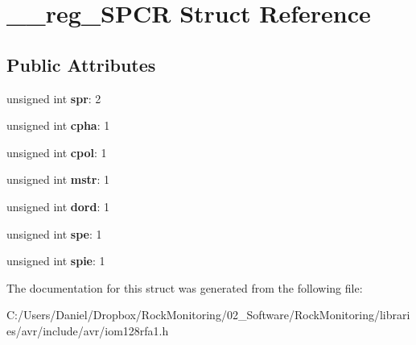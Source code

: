 \hypertarget{struct____reg___s_p_c_r}{}\section{\+\_\+\+\_\+reg\+\_\+\+S\+P\+CR Struct Reference}
\label{struct____reg___s_p_c_r}
\subsection*{Public Attributes}
\begin{DoxyCompactItemize}
\item 
unsigned int {\bfseries spr}\+: 2\hypertarget{struct____reg___s_p_c_r_aa7b7812e00307de4a4a326190c92e9a1}{}\label{struct____reg___s_p_c_r_aa7b7812e00307de4a4a326190c92e9a1}

\item 
unsigned int {\bfseries cpha}\+: 1\hypertarget{struct____reg___s_p_c_r_a503c32b8cf24f26f34dfb2f1ddf1b744}{}\label{struct____reg___s_p_c_r_a503c32b8cf24f26f34dfb2f1ddf1b744}

\item 
unsigned int {\bfseries cpol}\+: 1\hypertarget{struct____reg___s_p_c_r_ae00c7227f21e52348499e2dbf4a882f2}{}\label{struct____reg___s_p_c_r_ae00c7227f21e52348499e2dbf4a882f2}

\item 
unsigned int {\bfseries mstr}\+: 1\hypertarget{struct____reg___s_p_c_r_a68e47c805580855fd9c2a68f37343bc7}{}\label{struct____reg___s_p_c_r_a68e47c805580855fd9c2a68f37343bc7}

\item 
unsigned int {\bfseries dord}\+: 1\hypertarget{struct____reg___s_p_c_r_ac32ec40cc2446e9a783aea50e7bddbf0}{}\label{struct____reg___s_p_c_r_ac32ec40cc2446e9a783aea50e7bddbf0}

\item 
unsigned int {\bfseries spe}\+: 1\hypertarget{struct____reg___s_p_c_r_aa66ca8ba288f04b4383bb61cf4b867e2}{}\label{struct____reg___s_p_c_r_aa66ca8ba288f04b4383bb61cf4b867e2}

\item 
unsigned int {\bfseries spie}\+: 1\hypertarget{struct____reg___s_p_c_r_ae3c5582ef39cc78b1fc1fec8e02d9d24}{}\label{struct____reg___s_p_c_r_ae3c5582ef39cc78b1fc1fec8e02d9d24}

\end{DoxyCompactItemize}


The documentation for this struct was generated from the following file\+:\begin{DoxyCompactItemize}
\item 
C\+:/\+Users/\+Daniel/\+Dropbox/\+Rock\+Monitoring/02\+\_\+\+Software/\+Rock\+Monitoring/libraries/avr/include/avr/iom128rfa1.\+h\end{DoxyCompactItemize}
